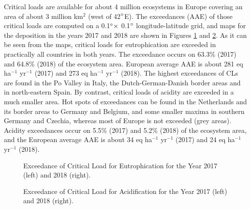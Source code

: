 Critical loads are available for about 4 million ecosystems in Europe covering an area
of about 3 million km$^{2}$ (west of 42$^\circ$E). The exceedances (AAE) of those critical loads
are computed on a 0.1$^\circ \times$ 0.1$^\circ$ longitude-latitude grid, and maps for the deposition in
the years 2017 and 2018 are shown in Figures \ref{fig:eutN} and \ref{fig:acid}. As it can be seen from
the maps, critical loads for eutrophication are exceeded in practically all countries in
both years. The exceedance occurs on 63.3\% (2017) and 64.8\% (2018) of the
ecosystem area. European average AAE is about 281 eq ha$^{-1}$ yr$^{-1}$ (2017) and 273 eq
ha$^{-1}$ yr$^{-1}$ (2018). The highest exceedances of CLs are found in the Po Valley in Italy, the
Dutch-German-Danish border areas and in north-eastern Spain.
By contrast, critical loads of acidity are exceeded in a much smaller area. Hot spots of
exceedances can be found in the Netherlands and its border areas to Germany and
Belgium, and some smaller maxima in southern Germany and Czechia,
whereas most of Europe is not exceeded (grey areas). Acidity exceedances occur
on 5.5\% (2017) and 5.2\% (2018) of the ecosystem area, and the European average
AAE is about 34 eq ha$^{-1}$ yr$^{-1}$ (2017) and 24 eq ha$^{-1}$ yr$^{-1}$ (2018).

\begin{figure}[ht]
  \centering
 \caption{Exceedance of Critical Load for Eutrophication for the Year 2017 (left) and 2018 (right).}
\label{fig:eutN}
\end{figure}

\begin{figure}[ht]
  \centering
 \caption{Exceedance of Critical Load for Acidification for the Year 2017 (left) and 2018 (right).}
\label{fig:acid}
\end{figure}

\clearpage
\renewcommand\bibname{References}      %

